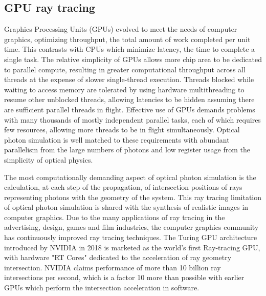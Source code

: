 \documentclass{webofc}
\begin{document}
\subsection{GPU ray tracing}%
%
Graphics Processing Units (GPUs) evolved to meet the needs of computer graphics, 
optimizing throughput\cite{throughput}, the total amount of work completed per unit time. 
This contrasts with CPUs which minimize latency, the time to complete a single task. 
The relative simplicity of GPUs allows more chip area to be dedicated to parallel compute, 
resulting in greater computational throughput across all threads at the expense of 
slower single-thread execution. Threads blocked while waiting to access memory are tolerated by using hardware multithreading to 
resume other unblocked threads, allowing latencies to be hidden assuming there are sufficient parallel threads in flight. 
%
Effective use of GPUs demands problems with many thousands of mostly independent parallel 
tasks, each of which requires few resources, allowing more threads to be in flight 
simultaneously.
%
Optical photon simulation is well matched to these requirements with abundant parallelism 
from the large numbers of photons and low register usage from the simplicity of optical physics.

The most computationally demanding aspect of optical photon simulation 
is the calculation, at each step of the propagation, 
of intersection positions of rays representing photons with the geometry of the system.
This ray tracing limitation of optical photon simulation is shared 
with the synthesis of realistic images in computer graphics. Due to the many applications
of ray tracing in the advertising, design, games and film industries, the computer graphics
community has continuously improved ray tracing techniques. The Turing GPU architecture 
introduced by NVIDIA in 2018 is marketed as the world's first Ray-tracing GPU, with   
hardware "RT Cores" 
dedicated to the 
acceleration of ray geometry intersection.
NVIDIA claims performance of more than 10 billion ray intersections 
per second, which is a factor 10 more than possible with earlier GPUs
which perform the intersection acceleration in software. 
%
%
\end{document}
